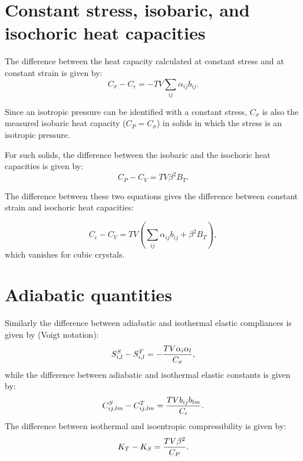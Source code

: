 \documentclass[12pt,a4paper,twoside]{report}
\begin{document}
\newpage
{\color{dark-blue}\chapter{Constant stress, isobaric, and isochoric 
heat capacities}}
\color{black}

The difference between the heat capacity calculated at constant stress
and at constant strain is given by:
\begin{equation}
C_\sigma - C_\epsilon = - T V \sum_{ij} \alpha_{ij} b_{ij}.
\end{equation}

Since an isotropic pressure can be identified with a constant stress, 
$C_\sigma$ is also the measured isobaric heat capacity ($C_P=C_\sigma$)
in solids in which the stress is an isotropic pressure.

For such solids, the difference between the isobaric and the isochoric 
heat capacities is given by:
\begin{equation}
C_P - C_V = T V \beta^2 B_T.
\end{equation}

The difference between these two equations gives the difference between
constant strain and isochoric heat capacities:

\begin{equation}
C_\epsilon - C_V =  T V \left( \sum_{ij} \alpha_{ij} b_{ij} + \beta^2 B_T
\right),
\end{equation}
which vanishes for cubic crystals.

\newpage
{\color{dark-blue}\chapter{Adiabatic quantities}}
\color{black}

Similarly the difference between adiabatic and isothermal 
elastic compliances is given by (Voigt notation):
\begin{equation}
S^S_{i,l} - S^T_{i,l} = - {T V \alpha_{i} \alpha_{l} \over C_\sigma},
\end{equation}
while the difference between adiabatic and isothermal elastic constants
is given by:
\begin{equation}
C^S_{ij,lm} - C^T_{ij,lm} =  {T V b_{ij} b_{lm} \over C_\epsilon}.
\end{equation}
The difference between isothermal and isoentropic compressibility is given
by:
\begin{equation}
K_T - K_S =  {T V \beta^2 \over C_P}.
\end{equation}
\end{document}
